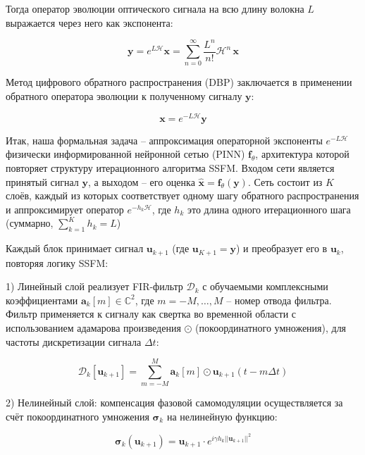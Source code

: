 Тогда оператор эволюции оптического сигнала на всю длину волокна $L$ выражается через него как экспонента:

\begin{equation}
	\mathbf{y} = e^{L \mathcal{H}} \mathbf{x}  = \sum_{n = 0}^{\infty} \frac{L^n}{n!} \mathcal{H}^n \, \mathbf{x}
\end{equation}

Метод цифрового обратного распространения (DBP) заключается в применении обратного оператора эволюции к полученному сигналу $\mathbf{y}$:

\begin{equation}
	\mathbf{x} = e^{-L \mathcal{H}} \mathbf{y}
\end{equation}

Итак, наша формальная задача -- аппроксимация операторной экспоненты $e^{-L \mathcal{H}}$ физически информированной нейронной сетью (PINN) $\mathbf{f}_{\theta}$, архитектура которой повторяет структуру итерационного алгоритма SSFM. Входом сети является принятый сигнал $\mathbf{y}$, а выходом -- его оценка $\hat{\mathbf{x}} = \mathbf{f}_{\theta}(\mathbf{y})$. Сеть состоит из $K$ слоёв, каждый из которых соответствует одному шагу обратного распространения и аппроксимирует оператор $e^{-h_k \mathcal{H}}$, где $h_k$ это длина одного итерационного шага (суммарно, $\sum_{k=1}^{K}h_k = L$)

Каждый блок принимает сигнал $\mathbf{u}_{k+1}$ (где $\mathbf{u}_{K+1} = \mathbf{y}$) и преобразует его в $\mathbf{u}_k$, повторяя логику SSFM:

1) Линейный слой реализует FIR-фильтр $\mathcal{D}_k$ с обучаемыми комплексными коэффициентами $\mathbf{a}_k[m] \in \mathbb{C}^2$, где $m = -M, \ldots, M$ -- номер отвода фильтра. Фильтр применяется к сигналу как свертка во временной области с использованием адамарова произведения $\odot$ (покоординатного умножения), для частоты дискретизации сигнала $\Delta t$:

\begin{equation}
	\mathcal{D}_k[\mathbf{u}_{k+1}] = \sum_{m=-M}^{M} \mathbf{a}_k[m] \odot \mathbf{u}_{k+1}(t - m \Delta t)
\end{equation}

2) Нелинейный слой: компенсация фазовой самомодуляции осуществляется за счёт покоординатного умножения $\boldsymbol{\sigma}_k$ на нелинейную функцию:

\begin{equation}
	\boldsymbol{\sigma}_k(\mathbf{u}_{k+1}) = \mathbf{u}_{k+1} \cdot e^{i \gamma h_k ||\mathbf{u}_{k+1}||^2}
\end{equation}

